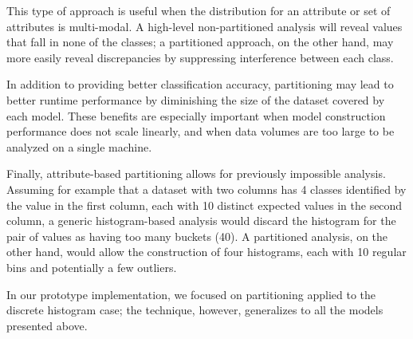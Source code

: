This type of approach is useful when the distribution for an attribute or set of attributes is multi-modal. A high-level non-partitioned analysis will reveal values that fall in none of the classes; a partitioned approach, on the other hand, may more easily reveal discrepancies by suppressing interference between each class.

In addition to providing better classification accuracy, partitioning may lead to better runtime performance by diminishing the size of the dataset covered by each model. These benefits are especially important when model construction performance does not scale linearly, and when data volumes are too large to be analyzed on a single machine.

Finally, attribute-based partitioning allows for previously impossible analysis. Assuming for example that a dataset with two columns has 4 classes identified by the value in the first column, each with 10 distinct expected values in the second column, a generic histogram-based analysis would discard the histogram for the pair of values as having too many buckets (40). A partitioned analysis, on the other hand, would allow the construction of four histograms, each with 10 regular bins and potentially a few outliers.

In our prototype implementation, we focused on partitioning applied to the discrete histogram case; the technique, however, generalizes to all the models presented above.
